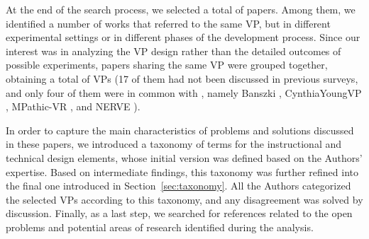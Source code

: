 At the end of the search process, we selected a total of \totalArticles papers. Among them, we identified a number of works that referred to the same VP, but in different experimental settings or in different phases of the development process. Since our interest was in analyzing the VP design rather than the detailed outcomes of possible experiments, papers sharing the same VP were grouped together, obtaining a total of \totalVPs VPs (17 of them had not been discussed in previous surveys, and only four of them were in common with \cite{lee2020effective}, namely Banszki \cite{banszki2018clinical,quail2016student}, CynthiaYoungVP \cite{foster2016using}, MPathic-VR \cite{guetterman2019medical,kron2017using}, and NERVE \cite{hirumi2016advancingPart2,hirumi2016advancing,kleinsmith2015understanding}). %

In order to capture the main characteristics of problems and solutions discussed in these papers, we introduced a taxonomy of terms for the instructional and technical design elements, whose initial version was defined based on the Authors’ expertise. Based on intermediate findings, this taxonomy was further refined into the final one introduced in Section~\ref{sec:taxonomy}. All the Authors categorized the selected VPs according to this taxonomy, and any disagreement was solved by discussion.
Finally, as a last step, we searched for references related to the open problems and potential areas of research identified during the analysis. 

















